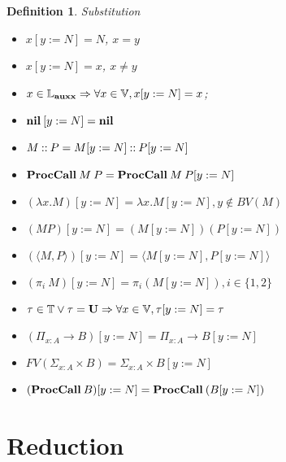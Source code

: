 \documentclass[a4paper]{article}
\newtheorem{defin}{Definition}
\begin{document}
\begin{defin} Substitution
  \begin{itemize}
    \item $x [y := N] = N$, $x = y$
    \item $x [y := N] = x$, $x \neq y$
    \item $x \in \mathbb{L}_{\bf auxx} \Rightarrow \forall x \in \mathbb{V}, x [y := N] = x$;
    \item ${\bf nil \:} [y := N] = {\bf nil}$
    \item $M {\: \bf :: \:} P = M [y := N] {\: \bf :: \:} P [y := N]$
    \item ${\bf ProcCall \:} M \: P = {\bf ProcCall \:} M \: P [y := N]$
    \item $(\lambda x. M) [y := N] = \lambda x. M [y := N], y \notin BV(M)$
    \item $(M P) [y := N] = (M [y := N]) (P [y := N])$
    \item $(\langle M , P \rangle) [y := N] = \langle M [y := N], P [y := N] \rangle$
    \item $(\pi_i \: M) [y := N] = \pi_i (M [y := N]), i \in \{ 1, 2\}$
    \item $\tau \in \mathbb{T} \vee \tau = {\bf U} \Rightarrow \forall x \in \mathbb{V}, \tau [y := N] = \tau$
    \item $(\Pi_{x : A} \to B) [y := N] = \Pi_{x : A} \to B [y := N]$
    \item $FV(\Sigma_{x : A} \times B) = \Sigma_{x : A} \times B [y := N]$
    \item $({\bf ProcCall \:} B) [y := N] = {\bf ProcCall \:} (B [y := N])$
  \end{itemize}
\end{defin}
\section{Reduction}
\end{document}

